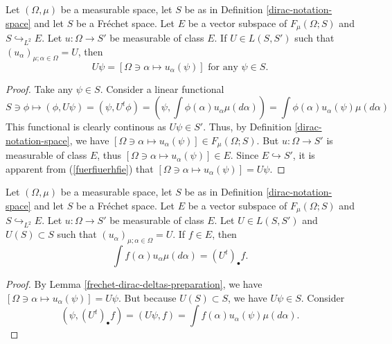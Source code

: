 \documentclass[main.tex]{subfiles}
\begin{document}
\begin{lemma}
\label{frechet-dirac-deltas-preparation}
Let $(\Omega, \mu)$ be a measurable space, let $S$ be as in Definition \ref{dirac-notation-space} and let $S$ be a Fr\'echet space. Let $E$ be a vector subspace of $F_\mu(\Omega; S)$ and $S\hookrightarrow_{L^2} E$. Let $u:\Omega\to S'$ be measurable of class $E$. If $U\in L(S, S')$ such that $(u_\alpha)_{\mu;\alpha\in \Omega} = U$, then
\begin{equation}
U\psi = [\Omega\ni\alpha\mapsto u_\alpha(\psi)] \text{ for any } \psi\in S.
\end{equation} 
\end{lemma}
\begin{proof}
Take any $\psi\in S$. Consider a linear functional
\begin{equation}
\label{fuerfiuerhfie}
S\ni \phi \mapsto (\phi, U\psi) = (\psi, U^t\phi) = (\psi, \int \phi(\alpha) u_\alpha \mu(d\alpha)) = \int \phi(\alpha) u_\alpha(\psi) \mu(d\alpha)
\end{equation}
This functional is clearly continous as $U\psi\in S'$. Thus, by Definition \ref{dirac-notation-space}, we have $[\Omega\ni\alpha\mapsto u_\alpha(\psi)] \in F_\mu(\Omega; S)$. But $u:\Omega\to S'$ is measurable of class $E$, thus $[\Omega\ni\alpha\mapsto u_\alpha(\psi)] \in E$. Since $E\hookrightarrow S'$,   it is apparent from (\ref{fuerfiuerhfie}) that $[\Omega\ni\alpha\mapsto u_\alpha(\psi)] = U\psi$.
\end{proof}
\begin{theorem}
\label{fretchet-integral-generalisation-justification}
Let $(\Omega, \mu)$ be a measurable space, let $S$ be as in Definition \ref{dirac-notation-space} and let $S$ be a Fr\'echet space. Let $E$ be a vector subspace of $F_\mu(\Omega; S)$ and $S\hookrightarrow_{L^2} E$. Let $u:\Omega\to S'$ be measurable of class $E$. Let $U\in L(S, S')$ and $U(S)\subset S$ such that $(u_\alpha)_{\mu;\alpha\in \Omega} = U$. If $f\in E$, then 
\begin{equation}
\int f(\alpha) u_\alpha \mu(d\alpha) = (U^t)_\bullet f.
\end{equation}
\end{theorem}
\begin{proof}
By Lemma \ref{frechet-dirac-deltas-preparation}, we have $[\Omega\ni\alpha\mapsto u_\alpha(\psi)] = U\psi$.
But because $U(S) \subset S$, we have $U\psi\in S$. Consider
\begin{equation}
(\psi, (U^t)_\bullet f) = (U\psi, f) = \int f(\alpha) u_\alpha(\psi) \mu(d\alpha).
\end{equation}
\end{proof}
\end{document}
